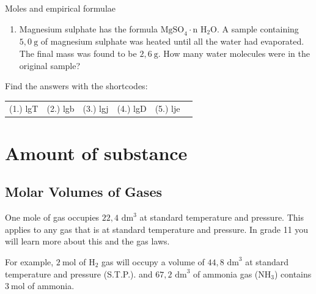 \begin{exercises}{Moles and empirical formulae
      }
\begin{enumerate}[noitemsep, label=\textbf{\arabic*}. ]
\item Magnesium sulphate has the formula $\text{MgSO}_{4} \cdot \text{n H}_{2}\text{O}$. A sample containing $5,0 ~\text{g}$ of magnesium sulphate was heated until all the water had evaporated. The final mass was found to be $2,6~\text{g}$. How many water molecules were in the original sample?
\end{enumerate}
\practiceinfo
\par {} Find the answers with the shortcodes:
 \par \begin{tabular}[h]{cccccc}
 (1.) lgT  &  (2.) lgb  &  (3.) lgj  &  (4.) lgD  & (5.) lje \end{tabular}
\end{exercises}
\section{Amount of substance}
            \subsection*{Molar Volumes of Gases}
            \nopagebreak
            \par
            \label{m38712*eip-id1168064596799}
  {One mole of gas occupies $22,4{\text{ dm}}^{3}$ at standard temperature and pressure. } 
      \label{m38712*id282112}This applies to any gas that is at standard temperature and pressure. In grade 11 you will learn more about this and the gas laws.\par 
For example, $2~\text{mol}$ of $\text{H}_2$ gas will occupy a volume of $44,8{\text{ dm}}^{3}$ at standard temperature and pressure (S.T.P.). and $67,2{\text{ dm}}^{3}$ of ammonia gas ($\text{NH}_3$) contains $3~\text{mol}$ of ammonia.
    \label{m38712*cid8}
